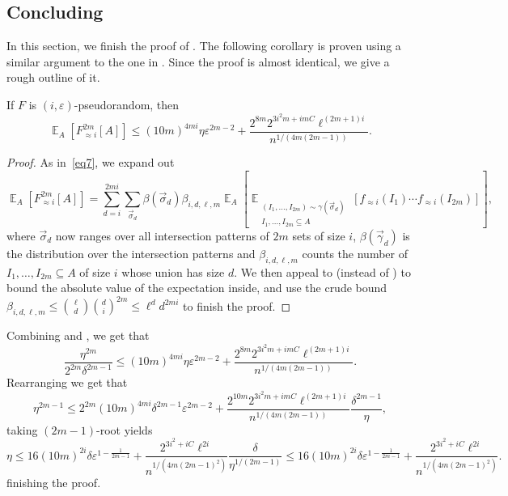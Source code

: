 \documentclass{toc}
\newcommand\Expect[2]{{\mathop{\mathbb{E}}_{#1}\left[ {#2} \right]}}
\newcommand\skipi{{\vskip 10pt}}
\newcommand\eps{\varepsilon}
\renewcommand\leq{\leqslant}
\newcommand\approxlvlfn[2]{{#1}_{\approx{#2}}}
\begin{document}
\subsection{Concluding }
In this section, we finish the proof of .
The following corollary is proven using a similar argument to the one in .
Since the proof is almost identical, we give a rough outline of it.
\begin{corollary}\label{lem:fourth_upper_high}
If $F$ is $(i,\eps)$-pseudorandom, then
\[
\Expect{A}{\approxlvlfn{F}{i}^{2m}[A]}\leq
(10m)^{4mi} \eta\eps^{2m-2}
+\frac{2^{8m}2^{3i^2m+imC} \ell^{(2m+1)i}}{n^{1/(4m(2m-1))}}.
\]
\end{corollary}
\begin{proof}
  As in~\eqref{eq7}, we expand out
  \begin{equation}\label{eq7'}
\Expect{A}{\approxlvlfn{F}{i}^{2m}[A]}%
=
\sum\limits_{d=i}^{2mi}{
\sum\limits_{\vec{\sigma}_d}{
\beta(\vec{\sigma}_d)\beta_{i,d,\ell,m}
\Expect{A}{\Expect{\substack{(I_1,\ldots,I_{2m}) \sim \gamma(\vec{\sigma}_d)\\ I_1,...,I_{2m}\subseteq A}}
{\approxlvlfn{f}{i}(I_1)\cdots\approxlvlfn{f}{i}(I_{2m})
}}}},
\end{equation}
where $\vec{\sigma}_d$ now ranges over all intersection patterns of $2m$ sets of size $i$, $\beta(\vec{\gamma}_d)$ is the distribution over the intersection patterns and
$\beta_{i,d,\ell,m}$ counts the number of $I_1,\ldots,I_{2m}\subseteq A$ of size $i$ whose union has size $d$. We then appeal to
 (instead of ) to bound the absolute value of the expectation inside, and use the crude bound
$\beta_{i,d,\ell,m}\leq \binom{\ell}{d}\binom{d}{i}^{2m}\leq \ell^{d} d^{2mi}$ to finish the proof.
\end{proof}

\skipi
Combining 
and , we get that
\[
\frac{\eta^{2m}}{2^{2m}\delta^{2m-1}}
\leq (10m)^{4mi}\eta\eps^{2m-2}
+\frac{2^{8m}2^{3i^2m+imC} \ell^{(2m+1)i}}{n^{1/(4m(2m-1))}}.
\]
Rearranging we get that
\[
\eta^{2m-1}\leq 2^{2m}(10m)^{4mi} \delta^{2m-1}\eps^{2m-2}
+\frac{2^{10m}2^{3i^2m+imC} \ell^{(2m+1)i}}{n^{1/(4m(2m-1))}}\frac{\delta^{2m-1}}{\eta},
\]
taking $(2m-1)$-root yields
\[
\eta\leq 16 (10m)^{2i}\delta\eps^{1-\frac{1}{2m-1}}
+\frac{2^{3i^2+iC}\ell^{2i}}{n^{1/(4m(2m-1)^2)}}\frac{\delta}{\eta^{1/(2m-1)}}
\leq 16 (10m)^{2i}\delta\eps^{1-\frac{1}{2m-1}}
+\frac{2^{3i^2+iC}\ell^{2i}}{n^{1/(4m(2m-1)^2)}}.
\]
finishing the proof.   %
%
%
\end{document}
